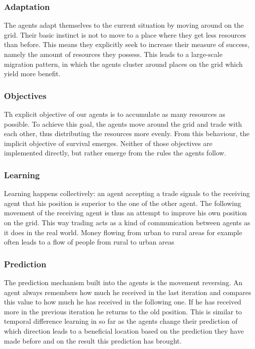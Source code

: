 \documentclass{JASSS}
\begin{document}
\subsubsection{Adaptation}
	The agents adapt themselves to the current situation by moving around on the grid. Their basic instinct is not to move to a place where they get less resources than before. This means they explicitly seek to increase their measure of success, namely the amount of resources they possess. This leads to a large-scale migration pattern, in which the agents cluster around places on the grid which yield more benefit.

\subsubsection{Objectives}
	Th explicit objective of our agents is to accumulate as many resources as possible. To achieve this goal, the agents move around the grid and trade with each other, thus distributing the resources more evenly. From this behaviour, the implicit objective of survival emerges. Neither of those objectives are implemented directly, but rather emerge from the rules the agents follow.

\subsubsection{Learning}
	Learning happens collectively: an agent accepting a trade signals to the receiving agent that his position is superior to the one of the other agent. The following movement of the receiving agent is thus an attempt to improve his own position on the grid. This way trading acts as a kind of communication between agents as it does in the real world. Money flowing from urban to rural areas for example often leads to a flow of people from rural to urban areas \citep{davis}

\subsubsection{Prediction}
	 The prediction mechanism built into the agents is the movement reversing. An agent always remembers how much he received in the last iteration and compares this value to how much he has received in the following one. If he has received more in the previous iteration he returns to the old position. This is similar to temporal difference learning in so far as the agents change their prediction of which direction leads to a beneficial location based on the prediction they have made before and on the result this prediction has brought.
\end{document}
